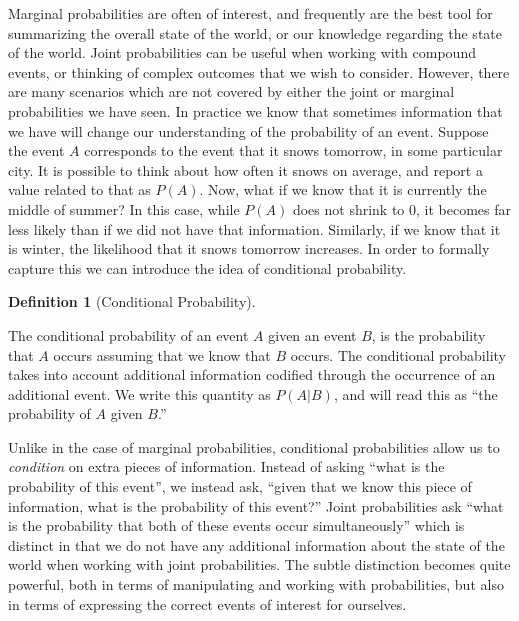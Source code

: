 \documentclass[
  letterpaper,
  DIV=11,
  numbers=noendperiod]{scrreprt}
\theoremstyle{definition}
\newtheorem{definition}{Definition}[chapter]
\theoremstyle{definition}
\theoremstyle{definition}
\theoremstyle{remark}
\begin{document}
Marginal probabilities are often of interest, and frequently are the
best tool for summarizing the overall state of the world, or our
knowledge regarding the state of the world. Joint probabilities can be
useful when working with compound events, or thinking of complex
outcomes that we wish to consider. However, there are many scenarios
which are not covered by either the joint or marginal probabilities we
have seen. In practice we know that sometimes information that we have
will change our understanding of the probability of an event. Suppose
the event \(A\) corresponds to the event that it snows tomorrow, in some
particular city. It is possible to think about how often it snows on
average, and report a value related to that as \(P(A)\). Now, what if we
know that it is currently the middle of summer? In this case, while
\(P(A)\) does not shrink to \(0\), it becomes far less likely than if we
did not have that information. Similarly, if we know that it is winter,
the likelihood that it snows tomorrow increases. In order to formally
capture this we can introduce the idea of conditional probability.

\begin{definition}[Conditional
Probability]\protect\hypertarget{def-conditional-probability}{}\label{def-conditional-probability}

The conditional probability of an event \(A\) given an event \(B\), is
the probability that \(A\) occurs assuming that we know that \(B\)
occurs. The conditional probability takes into account additional
information codified through the occurrence of an additional event. We
write this quantity as \(P(A|B)\), and will read this as ``the
probability of \(A\) given \(B\).''

\end{definition}

Unlike in the case of marginal probabilities, conditional probabilities
allow us to \emph{condition} on extra pieces of information. Instead of
asking ``what is the probability of this event'', we instead ask,
``given that we know this piece of information, what is the probability
of this event?'' Joint probabilities ask ``what is the probability that
both of these events occur simultaneously'' which is distinct in that we
do not have any additional information about the state of the world when
working with joint probabilities. The subtle distinction becomes quite
powerful, both in terms of manipulating and working with probabilities,
but also in terms of expressing the correct events of interest for
ourselves.
\end{document}
